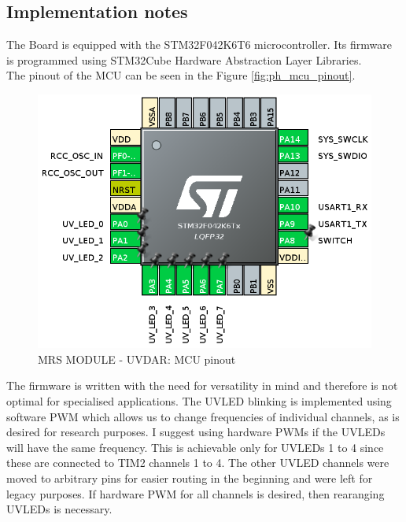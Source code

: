 \documentclass[12pt, a4paper]{article}
\begin{document}
\subsection{Implementation notes}
The Board is equipped with the STM32F042K6T6 microcontroller. Its firmware is programmed using STM32Cube Hardware Abstraction Layer Libraries.\\
The pinout of the MCU can be seen in the Figure \ref{fig:ph_mcu_pinout}.\\

\begin{figure}[h]
\centering
\includegraphics[width=0.9\linewidth]{figures/MCU_Pinout.png}
\caption{MRS MODULE - UVDAR: MCU pinout}
\label{fig:mcu_pinout}
\end{figure}

The firmware is written with the need for versatility in mind and therefore is not optimal for specialised applications. The UVLED blinking is implemented using software PWM which allows us to change frequencies of individual channels, as is desired for research purposes. I suggest using hardware PWMs if the UVLEDs will have the same frequency. This is achievable only for UVLEDs 1 to 4 since these are connected to TIM2 channels 1 to 4. The other UVLED channels were moved to arbitrary pins for easier routing in the beginning and were left for legacy purposes. If hardware PWM for all channels is desired, then rearanging UVLEDs is necessary.

\pagebreak
\end{document}
